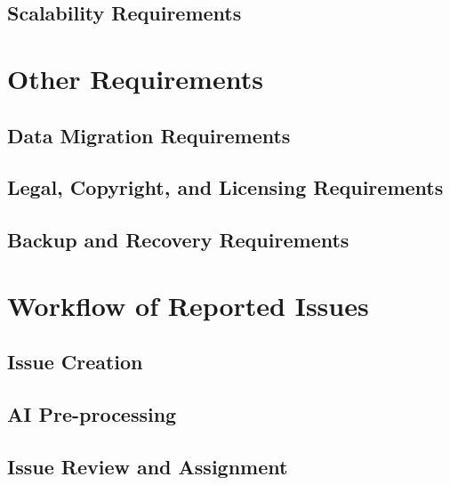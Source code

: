         \section{Scalability Requirements}
            
            
        
    \chapter{Other Requirements}\label{ch:Other Requirements}
        \section{Data Migration Requirements}
            
        \section{Legal, Copyright, and Licensing Requirements}
            
        \section{Backup and Recovery Requirements}
            


    \chapter{Workflow of Reported Issues}\label{ch:Workflow of Reported Issues}
            
        \section{Issue Creation}
            
        \section{AI Pre-processing}
            
        \section{Issue Review and Assignment}
            

